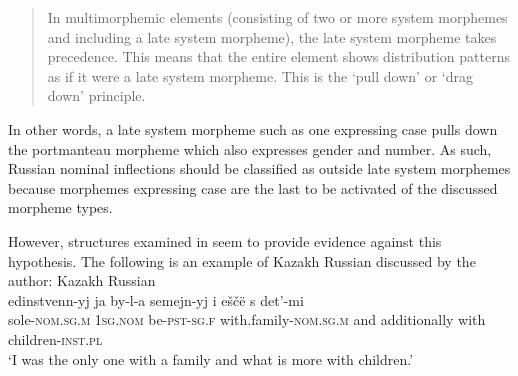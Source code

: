 \begin{quote}In multimorphemic elements (consisting of two or more system morphemes and including a late system morpheme), the late system morpheme takes precedence. This means that the entire element shows distribution patterns as if it were a late system morpheme. This is the `pull down' or `drag down' principle.
\end{quote}

\begin{sloppypar}
\noindent In other words, a late system morpheme such as one expressing case pulls down the portmanteau morpheme which also expresses gender and number. As such, Russian nominal inflections should be classified as outside late system morphemes because morphemes expressing case are the last to be activated of the discussed morpheme types.
\end{sloppypar}

However, structures examined in \citet{muhamedowa-untersuchung-2006} seem to provide evidence against this hypothesis. The following is an example of Kazakh Russian discussed by the author:
\ea \label{ex:1:15}
Kazakh Russian \citep[92]{muhamedowa-untersuchung-2006}\\
\gll edinstvenn-yj ja by-l-a semejn-yj i eščë s det'-mi\\
	sole-\textsc{nom.sg.m} \textsc{1sg.nom} be-\textsc{pst-sg.f} with.family-\textsc{nom.sg.m} and additionally with children-\textsc{inst.pl}\\
\glt `I was the only one with a family and what is more with children.'
\z

